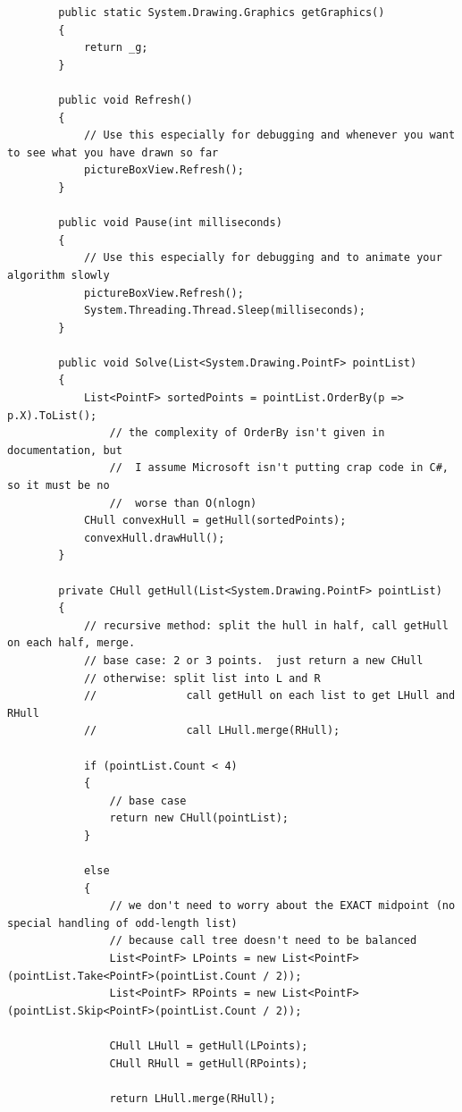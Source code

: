 \documentclass{article}
\begin{document}
\begin{itemize}
\begin{lstlisting}
        public static System.Drawing.Graphics getGraphics()
        {
            return _g;
        }

        public void Refresh()
        {
            // Use this especially for debugging and whenever you want to see what you have drawn so far
            pictureBoxView.Refresh();
        }

        public void Pause(int milliseconds)
        {
            // Use this especially for debugging and to animate your algorithm slowly
            pictureBoxView.Refresh();
            System.Threading.Thread.Sleep(milliseconds);
        }

        public void Solve(List<System.Drawing.PointF> pointList)
        {
            List<PointF> sortedPoints = pointList.OrderBy(p => p.X).ToList();
                // the complexity of OrderBy isn't given in documentation, but 
                //  I assume Microsoft isn't putting crap code in C#, so it must be no 
                //  worse than O(nlogn)
            CHull convexHull = getHull(sortedPoints);
            convexHull.drawHull();
        }

        private CHull getHull(List<System.Drawing.PointF> pointList)
        {
            // recursive method: split the hull in half, call getHull on each half, merge.
            // base case: 2 or 3 points.  just return a new CHull
            // otherwise: split list into L and R
            //              call getHull on each list to get LHull and RHull
            //              call LHull.merge(RHull);
            
            if (pointList.Count < 4)
            {
                // base case
                return new CHull(pointList);
            }

            else
            {
                // we don't need to worry about the EXACT midpoint (no special handling of odd-length list)
                // because call tree doesn't need to be balanced
                List<PointF> LPoints = new List<PointF>(pointList.Take<PointF>(pointList.Count / 2));
                List<PointF> RPoints = new List<PointF>(pointList.Skip<PointF>(pointList.Count / 2));

                CHull LHull = getHull(LPoints);
                CHull RHull = getHull(RPoints);

                return LHull.merge(RHull);


\end{lstlisting}
\end{itemize}
\end{document}
